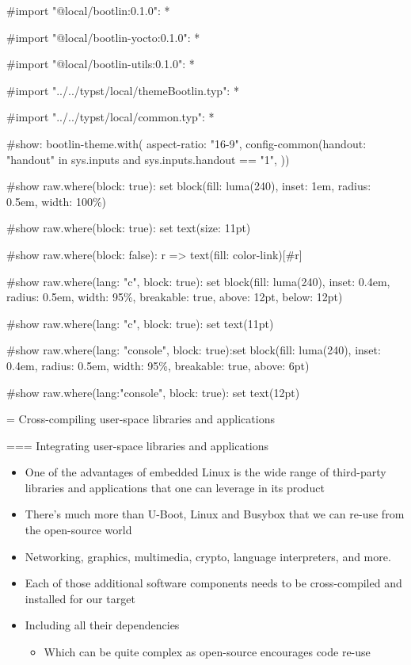 #import "@local/bootlin:0.1.0": *

#import "@local/bootlin-yocto:0.1.0": *

#import "@local/bootlin-utils:0.1.0": *

#import "../../typst/local/themeBootlin.typ": *

#import "../../typst/local/common.typ": *

#show: bootlin-theme.with( aspect-ratio: "16-9", config-common(handout: "handout" in sys.inputs and sys.inputs.handout == "1", ))

#show raw.where(block: true): set block(fill: luma(240), inset: 1em, radius: 0.5em, width: 100\%)

#show raw.where(block: true): set text(size: 11pt)

#show raw.where(block: false): r => text(fill: color-link)[#r]

#show raw.where(lang: "c", block: true): set block(fill: luma(240), inset: 0.4em, radius: 0.5em, width: 95\%, breakable: true, above: 12pt, below: 12pt)

#show raw.where(lang: "c", block: true): set text(11pt)

#show raw.where(lang: "console", block: true):set block(fill: luma(240), inset: 0.4em, radius: 0.5em, width: 95\%, breakable: true, above: 6pt)

#show raw.where(lang:"console", block: true): set text(12pt)

 = Cross-compiling user-space libraries and applications

=== {Integrating user-space libraries and applications}
  \begin{itemize}
  \item One of the advantages of embedded Linux is the wide range of
    third-party libraries and applications that one can leverage in
    its product
  \item There's much more than U-Boot, Linux and Busybox that we can
    re-use from the open-source world
  \item Networking, graphics, multimedia, crypto, language
    interpreters, and more.
  \item Each of those additional software components needs to be
    cross-compiled and installed for our target
  \item Including all their dependencies
    \begin{itemize}
    \item Which can be quite complex as open-source encourages code
      re-use
    \end{itemize}
  \end{itemize}


